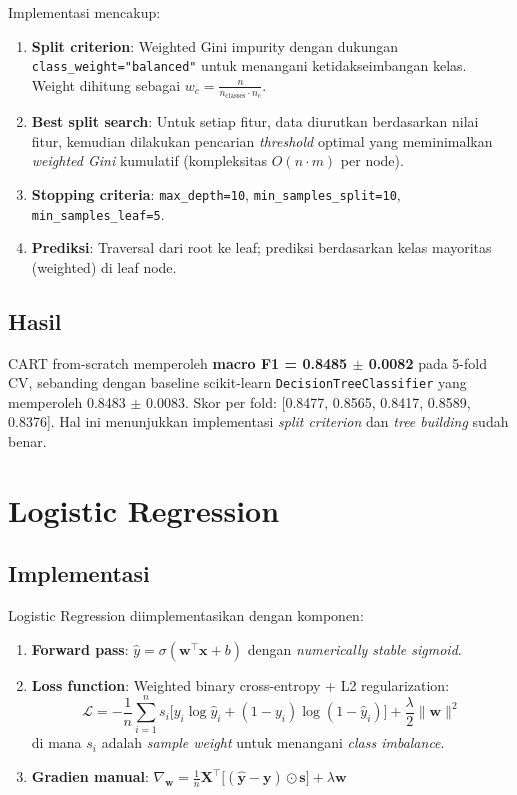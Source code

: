 \documentclass[12pt,a4paper]{article}
\begin{document}
Implementasi mencakup:
\begin{enumerate}
    \item \textbf{Split criterion}: Weighted Gini impurity dengan dukungan \texttt{class\_weight="balanced"} untuk menangani ketidakseimbangan kelas. Weight dihitung sebagai $w_c = \frac{n}{n_{\text{classes}} \cdot n_c}$.
    \item \textbf{Best split search}: Untuk setiap fitur, data diurutkan berdasarkan nilai fitur, kemudian dilakukan pencarian \textit{threshold} optimal yang meminimalkan \textit{weighted Gini} kumulatif (kompleksitas $O(n \cdot m)$ per node).
    \item \textbf{Stopping criteria}: \texttt{max\_depth=10}, \texttt{min\_samples\_split=10}, \texttt{min\_samples\_leaf=5}.
    \item \textbf{Prediksi}: Traversal dari root ke leaf; prediksi berdasarkan kelas mayoritas (weighted) di leaf node.
\end{enumerate}

\subsection{Hasil}

CART from-scratch memperoleh \textbf{macro F1 = 0.8485 $\pm$ 0.0082} pada 5-fold CV, sebanding dengan baseline scikit-learn \texttt{DecisionTreeClassifier} yang memperoleh 0.8483 $\pm$ 0.0083. Skor per fold: [0.8477, 0.8565, 0.8417, 0.8589, 0.8376]. Hal ini menunjukkan implementasi \textit{split criterion} dan \textit{tree building} sudah benar.

\section{Logistic Regression}
\label{sec:lr}

\subsection{Implementasi}

Logistic Regression diimplementasikan dengan komponen:
\begin{enumerate}
    \item \textbf{Forward pass}: $\hat{y} = \sigma(\mathbf{w}^\top \mathbf{x} + b)$ dengan \textit{numerically stable sigmoid}.
    \item \textbf{Loss function}: Weighted binary cross-entropy + L2 regularization:
    \[
        \mathcal{L} = -\frac{1}{n}\sum_{i=1}^{n} s_i \big[ y_i \log \hat{y}_i + (1 - y_i) \log (1 - \hat{y}_i) \big] + \frac{\lambda}{2} \|\mathbf{w}\|^2
    \]
    di mana $s_i$ adalah \textit{sample weight} untuk menangani \textit{class imbalance}.
    \item \textbf{Gradien manual}: $\nabla_\mathbf{w} = \frac{1}{n} \mathbf{X}^\top \big[ (\hat{\mathbf{y}} - \mathbf{y}) \odot \mathbf{s} \big] + \lambda \mathbf{w}$
\end{enumerate}
\end{document}
